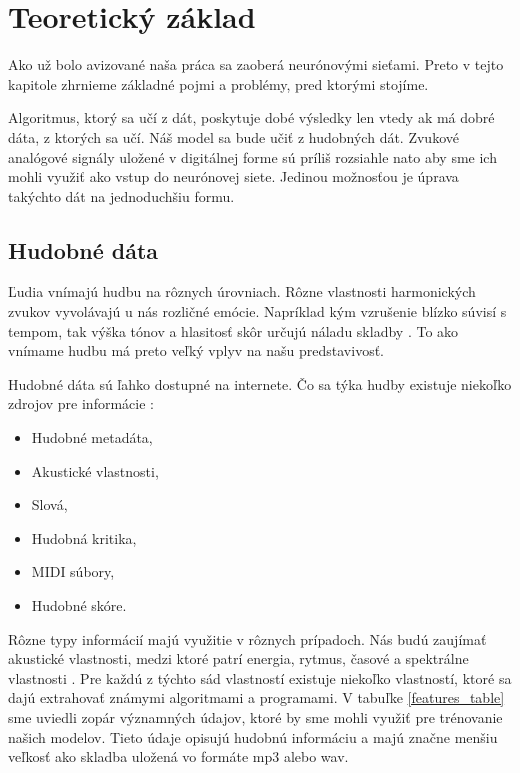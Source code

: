 \chapter{Teoretický základ}
\label{teoreticky_zaklad}

Ako už bolo avizované naša práca sa zaoberá neurónovými sieťami. Preto v tejto kapitole zhrnieme základné pojmi a problémy, pred ktorými stojíme.

Algoritmus, ktorý sa učí z dát, poskytuje dobé výsledky len vtedy ak má dobré dáta, z ktorých sa učí. 
Náš model sa bude učiť z hudobných dát.
Zvukové analógové signály uložené v digitálnej forme sú príliš rozsiahle nato aby sme ich mohli využiť ako vstup do neurónovej siete.
Jedinou možnosťou je úprava takýchto dát na jednoduchšiu formu.

\section{Hudobné dáta}
Ľudia vnímajú hudbu na rôznych úrovniach.
Rôzne vlastnosti harmonických zvukov vyvolávajú u nás rozličné emócie.
Napríklad kým vzrušenie blízko súvisí s tempom, tak výška tónov a hlasitosť skôr určujú náladu skladby \cite{emotionExtraction}.
To ako vnímame hudbu má preto veľký vplyv na našu predstavivosť.

Hudobné dáta sú ľahko dostupné na internete. Čo sa týka hudby existuje niekoľko zdrojov pre informácie \cite{musicMining}:
\begin{itemize}
	\item Hudobné metadáta,
	\item Akustické vlastnosti,
	\item Slová,
	\item Hudobná kritika,
	\item MIDI súbory,
	\item Hudobné skóre.
\end{itemize}
Rôzne typy informácií majú využitie v rôznych prípadoch.
Nás budú zaujímať akustické vlastnosti, medzi ktoré patrí energia, rytmus, časové a spektrálne vlastnosti \cite{emotionExtraction}.
Pre každú z týchto sád vlastností existuje niekoľko vlastností, ktoré sa dajú extrahovať známymi algoritmami a programami.
V tabuľke \ref{features_table} sme uviedli zopár významných údajov, ktoré by sme mohli využiť pre trénovanie našich modelov.
Tieto údaje opisujú hudobnú informáciu a majú značne menšiu veľkosť ako skladba uložená vo formáte mp3 alebo wav.


